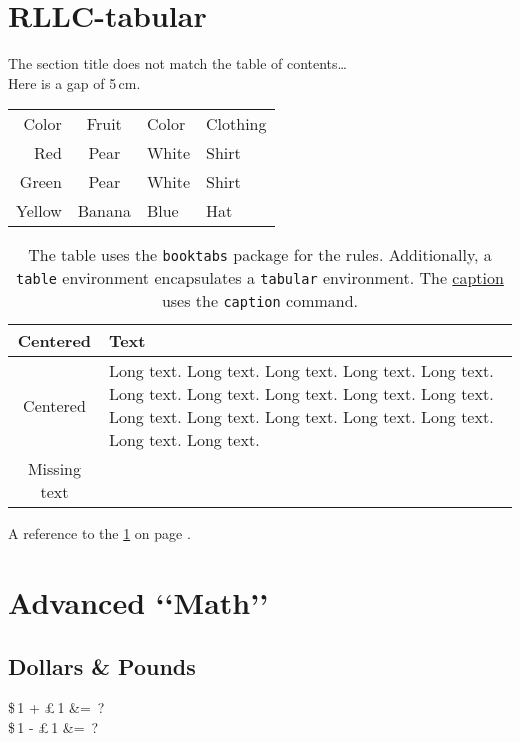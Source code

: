 \documentclass[a4paper, 10pt]{article}
\begin{document}
	\section[RLLC-Tabular]{RLLC-tabular}
	\label{sec:rclltab}
	The section title does not match the table of contents\dots \\
		\indent Here is a gap of 5\,cm.	%
		\vspace{5cm}								%
		
		\begin{table}[h!]
			\begin{tabular}{rcll}
			Color&Fruit&Color&Clothing\\
			Red&Pear&White&Shirt\\
			Green&Pear&White&Shirt\\
			Yellow&Banana&Blue&Hat
			\end{tabular}
		\end{table}
	
		\begin{table}[h!]
			\caption{The table uses the \texttt{booktabs} package for the rules. 
							Additionally, a \texttt{table} environment encapsulates a \texttt{tabular} environment. 
							The \underline{caption} uses the \texttt{caption} command.}
			\label{table 1}
			\begin{tabular}{c p{}}
				\toprule
				\textbf{Centered}  & \textbf{Text} \\
				\midrule
				Centered     & Long text. Long text. Long text. Long text. Long text. Long text. 
									Long text. Long text. Long text. Long text. Long text. Long text. 
									Long text. Long text. Long text. Long text. Long text. \\
				Missing text & 			\\ 
				\bottomrule
			\end{tabular}
		\end{table}

		
	A reference to the \ref{table 1} on page \pageref{table 1}.
	
	\section{Advanced \lq\lq Math\rq\rq}
		\subsection{Dollars \& Pounds}{\label{section 3.1}}
			\begin{flalign}
				\$\,1 + \pounds\,1 &=  \,? \\
				\$\,1 - \pounds\,1 &=  \,?
			\end{flalign}
			
\end{document}
